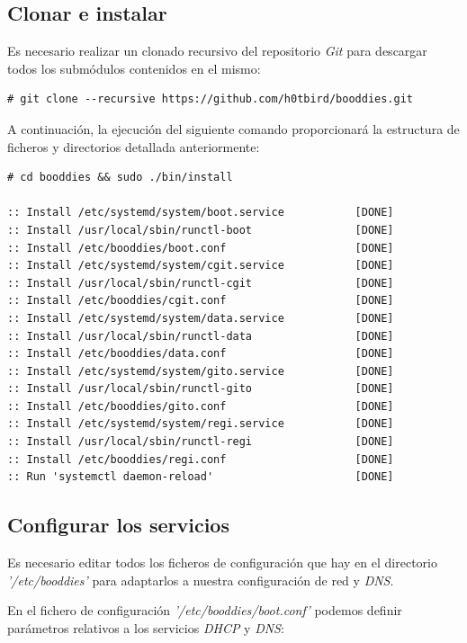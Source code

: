 \documentclass[a4paper,12pt,spanish,final]{epsc_tfc_pfc}
\begin{document}
\subsection{Clonar e instalar}

Es necesario realizar un clonado recursivo del repositorio \emph{Git} para descargar todos los submódulos contenidos en el mismo:\\

\begin{lstlisting}[style=dnsmasq]
# git clone --recursive https://github.com/h0tbird/booddies.git
\end{lstlisting}

A continuación, la ejecución del siguiente comando proporcionará la estructura de ficheros y directorios detallada anteriormente:\\

\begin{lstlisting}[style=dnsmasq]
# cd booddies && sudo ./bin/install

:: Install /etc/systemd/system/boot.service           [DONE]
:: Install /usr/local/sbin/runctl-boot                [DONE]
:: Install /etc/booddies/boot.conf                    [DONE]
:: Install /etc/systemd/system/cgit.service           [DONE]
:: Install /usr/local/sbin/runctl-cgit                [DONE]
:: Install /etc/booddies/cgit.conf                    [DONE]
:: Install /etc/systemd/system/data.service           [DONE]
:: Install /usr/local/sbin/runctl-data                [DONE]
:: Install /etc/booddies/data.conf                    [DONE]
:: Install /etc/systemd/system/gito.service           [DONE]
:: Install /usr/local/sbin/runctl-gito                [DONE]
:: Install /etc/booddies/gito.conf                    [DONE]
:: Install /etc/systemd/system/regi.service           [DONE]
:: Install /usr/local/sbin/runctl-regi                [DONE]
:: Install /etc/booddies/regi.conf                    [DONE]
:: Run 'systemctl daemon-reload'                      [DONE]
\end{lstlisting}

\subsection{Configurar los servicios}

Es necesario editar todos los ficheros de configuración que hay en el directorio \emph{'/etc/booddies'} para adaptarlos a nuestra configuración de red y \emph{DNS}.

En el fichero de configuración \emph{'/etc/booddies/boot.conf'} podemos definir parámetros relativos a los servicios \emph{DHCP} y \emph{DNS}:\\
\end{document}
